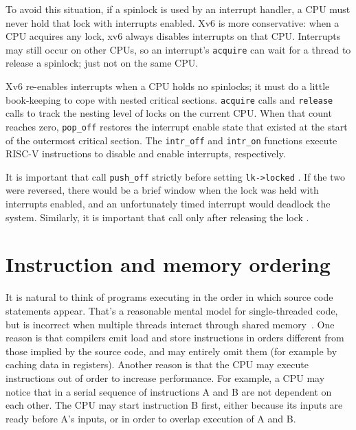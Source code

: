 To avoid this situation, if a spinlock is used by an interrupt handler,
a CPU must never hold that lock with interrupts enabled.
Xv6 is more conservative: when a CPU acquires any
lock, xv6 always disables interrupts on that CPU.
Interrupts may still occur on other CPUs, so 
an interrupt's
\lstinline{acquire}
can wait for a thread to release a spinlock; just not on the same CPU.

Xv6 re-enables interrupts when a CPU holds no spinlocks; it must
do a little book-keeping to cope with nested critical sections.
\lstinline{acquire}
calls
and
\lstinline{release}
calls
to track the nesting level of locks on the current CPU.
When that count reaches zero,
\lstinline{pop_off} 
restores the interrupt enable state that existed 
at the start of the outermost critical section.
The
\lstinline{intr_off}
and
\lstinline{intr_on}
functions execute RISC-V instructions to disable and enable
interrupts, respectively.

It is important that
call
\lstinline{push_off}
strictly before setting
\lstinline{lk->locked}
.
If the two were reversed, there would be
a brief window when the lock
was held with interrupts enabled, and
an unfortunately timed interrupt would deadlock the system.
Similarly, it is important that
call
only after 
releasing the lock
.

\section{Instruction and memory ordering}

It is natural to think of programs executing in the order
in which source code statements appear.
That's a reasonable mental model for single-threaded
code, but is incorrect when
multiple threads interact through shared memory~\cite{riscv:user,boehm04}.
One reason is that compilers emit load and store
instructions in orders different from those implied
by the source code, and may entirely omit them
(for example by caching data in registers).
Another reason is that the CPU may execute instructions
out of order to increase performance.
For
example, a CPU may notice that in a serial sequence of
instructions A and B are not dependent on each other.
The CPU may start instruction B first, either because its
inputs are ready before A's inputs, or in order to overlap
execution of A and B.

